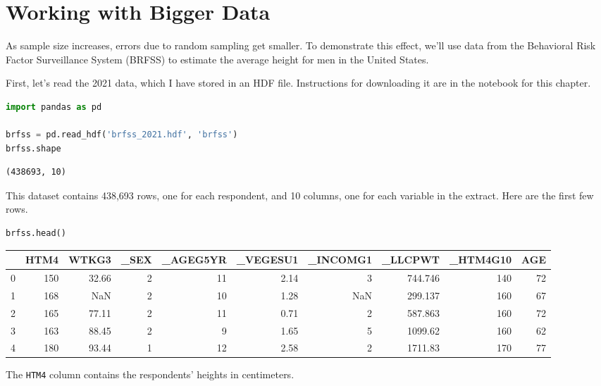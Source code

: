 \section{Working with Bigger Data}\label{working-with-bigger-data}

As sample size increases, errors due to random sampling get smaller. To
demonstrate this effect, we'll use data from the Behavioral Risk Factor
Surveillance System (BRFSS) to estimate the average height for men in
the United States.

\pagebreak

First, let's read the 2021 data, which I have stored in an HDF file.
Instructions for downloading it are in the notebook for this chapter.

\begin{lstlisting}[language=Python,style=source]
import pandas as pd

brfss = pd.read_hdf('brfss_2021.hdf', 'brfss')
brfss.shape
\end{lstlisting}

\begin{lstlisting}[style=output]
(438693, 10)
\end{lstlisting}

This dataset contains 438,693 rows, one for each respondent, and 10
columns, one for each variable in the extract. Here are the first few
rows.

\begin{lstlisting}[language=Python,style=source]
brfss.head()
\end{lstlisting}



\begin{tabular}{lrrrrrrrrr}
\toprule
 & HTM4 & WTKG3 & \_SEX & \_AGEG5YR & \_VEGESU1 & \_INCOMG1 & \_LLCPWT & \_HTM4G10 & AGE \\
\midrule
0 & 150 & 32.66 & 2 & 11 & 2.14 & 3 & 744.746 & 140 & 72 \\
1 & 168 & NaN & 2 & 10 & 1.28 & NaN & 299.137 & 160 & 67 \\
2 & 165 & 77.11 & 2 & 11 & 0.71 & 2 & 587.863 & 160 & 72 \\
3 & 163 & 88.45 & 2 & 9 & 1.65 & 5 & 1099.62 & 160 & 62 \\
4 & 180 & 93.44 & 1 & 12 & 2.58 & 2 & 1711.83 & 170 & 77 \\
\bottomrule
\end{tabular}

The \passthrough{\lstinline!HTM4!} column contains the respondents'
heights in centimeters.

